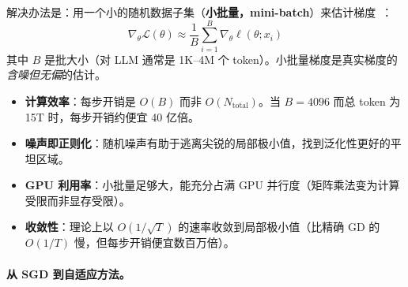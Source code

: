 解决办法是：用一个小的随机数据子集（\textbf{小批量，mini-batch}）来估计梯度~\cite{robbins1951stochastic}：
\[
\nabla_\theta \mathcal{L}(\theta) \approx \frac{1}{B}\sum_{i=1}^{B} \nabla_\theta \ell(\theta; x_i)
\]
其中 $B$ 是批大小（对 LLM 通常是 1K--4M 个 token）。小批量梯度是真实梯度的\emph{含噪但无偏}的估计。

\begin{keybox}
\begin{itemize}
  \item \textbf{计算效率}：每步开销是 $O(B)$ 而非 $O(N_{\text{total}})$。当 $B = 4096$ 而总 token 为 15T 时，每步开销约便宜 40 亿倍。
  \item \textbf{噪声即正则化}：随机噪声有助于逃离尖锐的局部极小值，找到泛化性更好的平坦区域。
  \item \textbf{GPU 利用率}：小批量足够大，能充分占满 GPU 并行度（矩阵乘法变为计算受限而非显存受限）。
  \item \textbf{收敛性}：理论上以 $O(1/\sqrt{T})$ 的速率收敛到局部极小值（比精确 GD 的 $O(1/T)$ 慢，但每步开销便宜数百万倍）。
\end{itemize}
\end{keybox}

\paragraph{从 SGD 到自适应方法。}
\label{from-sgd-to-adaptive-methods.}

